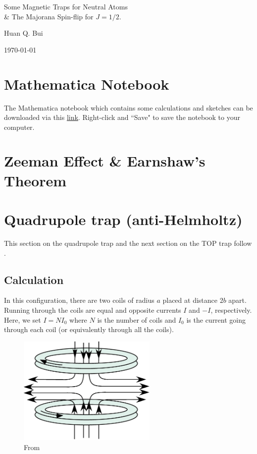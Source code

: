 \documentclass{article}
\theoremstyle{definition}
\begin{document}
	

\begin{center}
	\Large{Some Magnetic Traps for Neutral Atoms \\
	\& The Majorana Spin-flip for $J=1/2$.}
\end{center}	
	
\begin{center}
	\large{Huan Q. Bui}
\end{center}

\begin{center}
	\today
\end{center}



\section{Mathematica Notebook}
The Mathematica notebook which contains some calculations and sketches can be downloaded via this \href{https://raw.githubusercontent.com/huanium/huanium/master/MIT PhD/BUI_AtomicPhysics/mathematica/magnetic-traps.nb}{link}. Right-click and ``Save" to save the notebook to your computer. 


\section{Zeeman Effect \& Earnshaw's Theorem}



\section{Quadrupole trap (anti-Helmholtz)}

This section on the quadrupole trap and the next section on the TOP trap follow \cite{perez2013does}.

\subsection{Calculation}


In this configuration, there are two coils of radius $a$ placed at distance $2b$ apart. Running through the coils are equal and opposite currents $I$ and $-I$, respectively. Here, we set $I = NI_0$ where $N$ is the number of coils and $I_0$ is the current going through each coil (or equivalently through all the coils).

\begin{figure}[!htb]
	\centering
	\includegraphics[width=0.6\textwidth]{antiHelmholtz.png}
	\caption{From \cite{maruyama2003optical}}
\end{figure}
\end{document}
